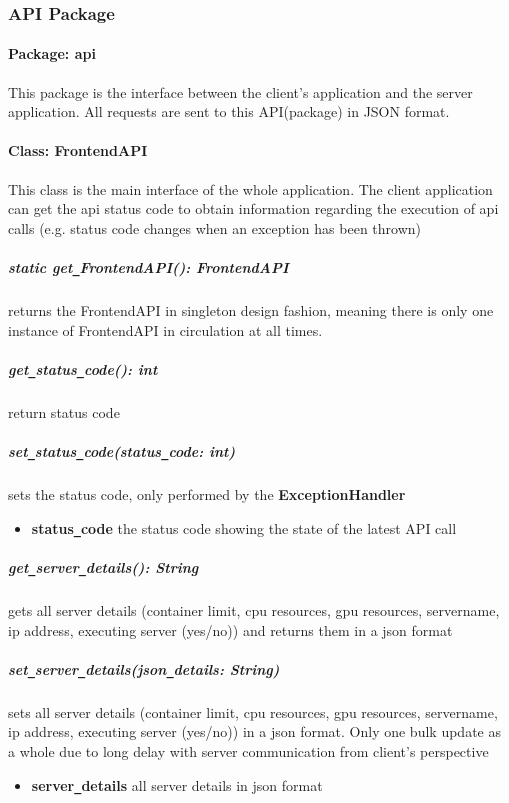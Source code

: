 \subsubsection{\label{API} API Package}
\paragraph{Package: api} This package is the interface between the client's application and the server application. 
All requests are sent to this API(package) in JSON format.

\paragraph{Class: FrontendAPI}

This class is the main interface of the whole application. The client application
can get the api status code to obtain information regarding the execution of api calls (e.g. status code
changes when an exception has been thrown)

\subparagraph{static get\texttt{\_}FrontendAPI(): FrontendAPI} returns the FrontendAPI in singleton design fashion, meaning 
there is only one instance of FrontendAPI in circulation at all times.

\subparagraph{get\texttt{\_}status\texttt{\_}code(): int} return status code  

\subparagraph{set\texttt{\_}status\texttt{\_}code(status\texttt{\_}code: int)}
sets the status code, only performed by the \textbf{ExceptionHandler}
\begin{itemize}
        \item \textbf{status\texttt{\_}code}
        the status code showing the state of the latest API call
\end{itemize}

\subparagraph{get\texttt{\_}server\texttt{\_}details(): String}
gets all server details (container limit, cpu resources, gpu resources, servername, ip address, executing server (yes/no)) 
and returns them in a json format 

\subparagraph{set\texttt{\_}server\texttt{\_}details(json\texttt{\_}details: String)}
sets all server details (container limit, cpu resources, gpu resources, servername, ip address, executing server (yes/no)) in
 a json format. Only one bulk update as a whole
due to long delay with server communication from client's perspective
\begin{itemize}
        \item \textbf{server\texttt{\_}details}
        all server details in json format
\end{itemize}


